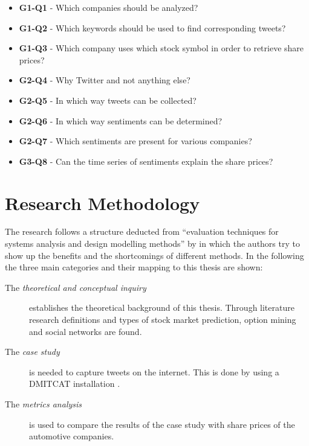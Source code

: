\begin{itemize}
    \item \textbf{G1-Q1} - Which companies should be analyzed?
    \item \textbf{G1-Q2} - Which keywords should be used to find corresponding tweets?
    \item \textbf{G1-Q3} - Which company uses which stock symbol in order to retrieve share prices?
    \item \textbf{G2-Q4} - Why Twitter and not anything else?
    \item \textbf{G2-Q5} - In which way tweets can be collected?
    \item \textbf{G2-Q6} - In which way sentiments can be determined?
    \item \textbf{G2-Q7} - Which sentiments are present for various companies?
	\item \textbf{G3-Q8} - Can the time series of sentiments explain the share prices?
\end{itemize}

\section{Research Methodology}
\label{s:introduction-researchmethodology}

The research follows a structure deducted from ``evaluation techniques for systems analysis and design modelling methods'' by \citet{Siau2011} in which the authors try to show up the benefits and the shortcomings of different methods.
In the following the three main categories and their mapping to this thesis are shown:

\begin{description}
	\item[The \emph{theoretical and conceptual inquiry}]
		establishes the theoretical background of this thesis.
		Through literature research definitions and types of stock market prediction, option mining and social networks are found.
	
	\item[The \emph{case study}]
		is needed to capture tweets on the internet.
		This is done by using a \ac{DMITCAT} installation
		\citep{Borra2014}.
	
	\item[The \emph{metrics analysis}]
		is used to compare the results of the case study with share prices of the automotive companies.
\end{description}

